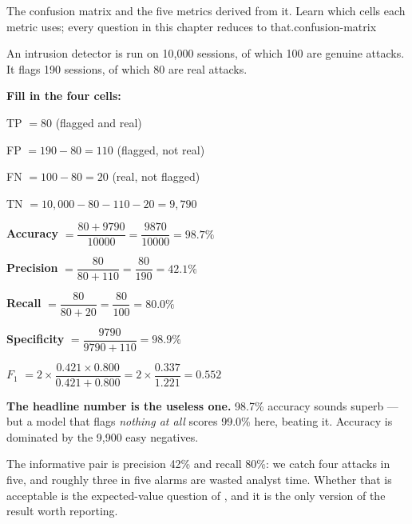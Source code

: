 {}%
{The confusion matrix and the five metrics derived from it. Learn which cells each metric
uses; every question in this chapter reduces to that.}{confusion-matrix}

\begin{worked}
An intrusion detector is run on 10{,}000 sessions, of which 100 are genuine
attacks. It flags 190 sessions, of which 80 are real attacks.

\smallskip
\textbf{Fill in the four cells:}
\begin{tight}
  \item TP $= 80$ (flagged and real)
  \item FP $= 190 - 80 = 110$ (flagged, not real)
  \item FN $= 100 - 80 = 20$ (real, not flagged)
  \item TN $= 10{,}000 - 80 - 110 - 20 = 9{,}790$
\end{tight}

\smallskip
\textbf{Accuracy} $= \dfrac{80 + 9790}{10000} = \dfrac{9870}{10000} = \mathbf{98.7\%}$

\textbf{Precision} $= \dfrac{80}{80+110} = \dfrac{80}{190} = \mathbf{42.1\%}$

\textbf{Recall} $= \dfrac{80}{80+20} = \dfrac{80}{100} = \mathbf{80.0\%}$

\textbf{Specificity} $= \dfrac{9790}{9790+110} = \mathbf{98.9\%}$

\textbf{$F_1$} $= 2 \times \dfrac{0.421 \times 0.800}{0.421 + 0.800}
= 2 \times \dfrac{0.337}{1.221} = \mathbf{0.552}$

\smallskip
\textbf{The headline number is the useless one.} 98.7\% accuracy sounds superb ---
but a model that flags \emph{nothing at all} scores 99.0\% here, beating it.
Accuracy is dominated by the 9{,}900 easy negatives.

The informative pair is precision 42\% and recall 80\%: we catch four attacks in
five, and roughly three in five alarms are wasted analyst time. Whether that is
acceptable is the expected-value question of , and it is the
only version of the result worth reporting.
\end{worked}

